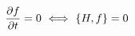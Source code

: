 \documentclass[preview]{standalone}
\begin{document}
\begin{align*}
\special{dvisvgm:raw <g id='unique000'>}\pdv{f}{t}=0\ \Longleftrightarrow\ \pb{H}{f}=0\special{dvisvgm:raw </g>}
\end{align*}
\end{document}
